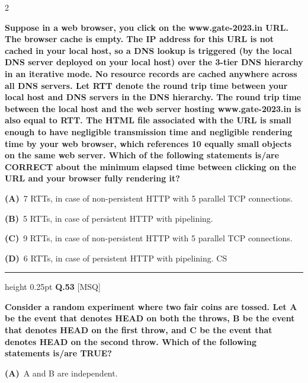 \documentclass[a4paper,10pt,twoside]{article}
\begin{document}
\begin{multicols}{2}
{\bfseries Suppose in a web browser, you click on the www.gate-2023.in URL. The browser
cache is empty. The IP address for this URL is not cached in your local host, so
a DNS lookup is triggered (by the local DNS server deployed on your local host)
over the 3-tier DNS hierarchy in an iterative mode. No resource records are cached
anywhere across all DNS servers.
Let RTT denote the round trip time between your local host and DNS servers
in the DNS hierarchy. The round trip time between the local host and the web
server hosting www.gate-2023.in is also equal to RTT. The HTML ﬁle associated
with the URL is small enough to have negligible transmission time and negligible
rendering time by your web browser, which references 10 equally small objects on
the same web server.
Which of the following statements is/are CORRECT about the minimum elapsed
time between clicking on the URL and your browser fully rendering it? \par}
\par\vspace{2pt}\noindent
\textbf{(A)}~7 RTTs, in case of non-persistent HTTP with 5 parallel TCP connections.\par\vspace{2pt}\noindent
\textbf{(B)}~5 RTTs, in case of persistent HTTP with pipelining.\par\vspace{2pt}\noindent
\textbf{(C)}~9 RTTs, in case of non-persistent HTTP with 5 parallel TCP connections.\par\vspace{2pt}\noindent
\textbf{(D)}~6 RTTs, in case of persistent HTTP with pipelining. \newline CS
\par\vspace{6pt}\hrule height 0.25pt\vspace{6pt}
\noindent\textbf{Q.53} \hfill {\footnotesize\textsf{[MSQ]}}
\par\vspace{2pt}
{\bfseries Consider a random experiment where two fair coins are tossed. Let A be the event
that denotes HEAD on both the throws, B be the event that denotes HEAD on
the ﬁrst throw, and C be the event that denotes HEAD on the second throw.
Which of the following statements is/are TRUE? \par}
\par\vspace{2pt}\noindent
\textbf{(A)}~A and B are independent.\par\vspace{2pt}\noindent

\end{multicols}
\end{document}

